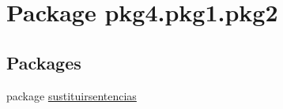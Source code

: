 \hypertarget{namespacepkg4_1_1pkg1_1_1pkg2}{}\section{Package pkg4.\+pkg1.\+pkg2}
\label{namespacepkg4_1_1pkg1_1_1pkg2}
\subsection*{Packages}
\begin{DoxyCompactItemize}
\item 
package \mbox{\hyperlink{namespacepkg4_1_1pkg1_1_1pkg2_1_1sustituirsentencias}{sustituirsentencias}}
\end{DoxyCompactItemize}

